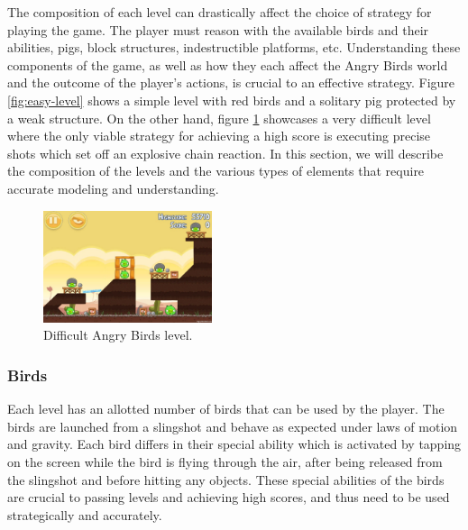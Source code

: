 The composition of each level can drastically affect the choice of strategy for playing the game. The player must reason with the available birds and their abilities, pigs, block structures, indestructible platforms, etc. Understanding these components of the game, as well as how they each affect the Angry Birds world and the outcome of the player's actions, is crucial to an effective strategy. Figure \ref{fig:easy-level} shows a simple level with red birds and a solitary pig protected by a weak structure. On the other hand, figure \ref{fig:hard-level} showcases a very difficult level where the only viable strategy for achieving a high score is executing precise shots which set off an explosive chain reaction. In this section, we will describe the composition of the levels and the various types of elements that require accurate modeling and understanding. 

\setlength{\belowcaptionskip}{-8pt}

\begin{figure}
\begin{center}
\includegraphics[trim = 0 20 0 20, clip, width=0.44\textwidth]{images/hard-level.jpg}
\end{center}
\caption{Difficult Angry Birds level.}
\label{fig:hard-level}
\end{figure}

\subsubsection{Birds}
Each level has an allotted number of birds that can be used by the player. The birds are launched from a slingshot and behave as expected under laws of motion and gravity. Each bird differs in their special ability which is activated by tapping on the screen while the bird is flying through the air, after being released from the slingshot and before hitting any objects. These special abilities of the birds are crucial to passing levels and achieving high scores, and thus need to be used strategically and accurately.

